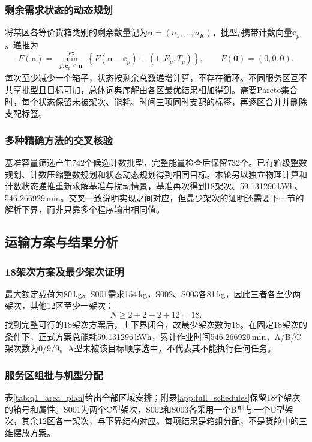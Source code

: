 \subsubsection{剩余需求状态的动态规划}
将某区各等价货箱类别的剩余数量记为$\boldsymbol n=(n_1,\ldots,n_K)$，批型$p$携带计数向量$\boldsymbol c_p$。递推为
\begin{equation}
 F(\boldsymbol n)=\min_{\substack{p:\boldsymbol c_p\le\boldsymbol n}}^{\mathrm{lex}}
 \left\{F(\boldsymbol n-\boldsymbol c_p)+(1,E_p,T_p)\right\},\qquad F(\boldsymbol0)=(0,0,0).
\label{eq:q1_dp}
\end{equation}
每次至少减少一个箱子，状态按剩余总数递增计算，不存在循环。不同服务区互不共享批型且目标可加，总体词典序解由各区最优结果相加得到。需要Pareto集合时，每个状态保留未被架次、能耗、时间三项同时支配的标签，再逐区合并并删除支配标签。



\subsubsection{多种精确方法的交叉核验}
基准容量筛选产生742个候选计数批型，完整能量检查后保留732个。已有箱级整数规划、计数压缩整数规划和状态动态规划得到相同目标。本轮另以独立物理计算和计数状态递推重新求解基准与扰动情景，基准再次得到18架次、59.131296\,kWh、546.266929\,min。交叉一致说明实现之间对应，但最少架次的证明还需要下一节的解析下界，而非只靠多个程序输出相同值。

\subsection{运输方案与结果分析}
\subsubsection{18架次方案及最少架次证明}
最大额定载荷为80\,kg。S001需求154\,kg，S002、S003各81\,kg，因此三者各至少两架次，其他12区至少一架次：
\begin{equation}
 N\ge2+2+2+12=18.
\label{eq:q1_sortie_lb}
\end{equation}
找到完整可行的18架次方案后，上下界闭合，故最少架次数为18。在固定18架次的条件下，正式方案总能耗59.131296\,kWh，累计作业时间546.266929\,min，A/B/C架次数为0/9/9。A型未被该目标顺序选中，不代表其不能执行任何任务。

\subsubsection{服务区组批与机型分配}
表\ref{tab:q1_area_plan}给出全部区域安排；附录\ref{app:full_schedules}保留18个架次的箱号和属性。S001为两个C型架次，S002和S003各采用一个B型与一个C型架次，其余12区各一架次，与下界结构对应。每项结果是箱组分配，不是货舱中的三维摆放方案。


